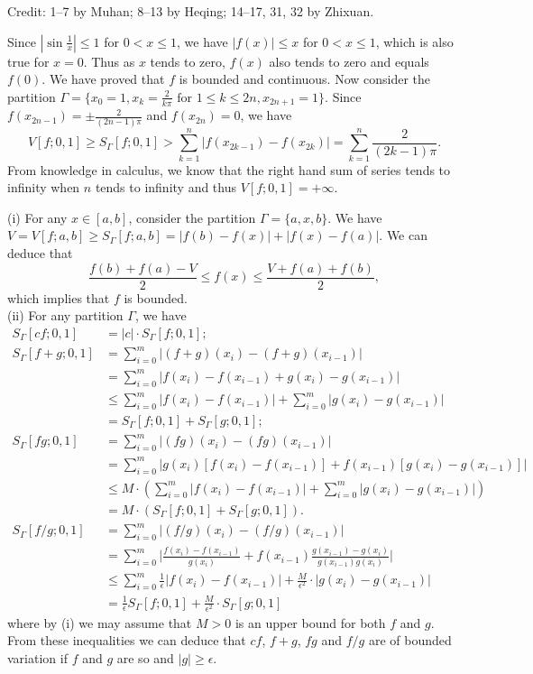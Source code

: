 
Credit: 1--7 by Muhan; 8--13 by Heqing; 14--17, 31, 32 by Zhixuan.

\begin{exercise}{2.1}
  Since $|\sin{\frac{1}{x}}|\leq1$ for $0<x\leq 1$,
  we have $|f(x)|\leq x$ for $0<x\leq 1$,
  which is also true for $x=0$.
  Thus as $x$ tends to zero,
  $f(x)$ also tends to zero and equals $f(0)$.
  We have proved that $f$ is bounded and continuous.
  Now consider the partition
  $\Gamma=\{x_0=1,x_k=\frac{2}{k\pi}\text{ for }1\leq k\leq 2n, x_{2n+1}=1\}$.
  Since $f(x_{2n-1})=\pm\frac{2}{(2n-1)\pi}$ and $f(x_{2n})=0$,
  we have
  \[
    V[f;0,1]\geq S_{\Gamma}[f;0,1]>\sum_{k=1}^{n}|f(x_{2k-1})-f(x_{2k})|=\sum_{k=1}^{n}\frac{2}{(2k-1)\pi}.
  \]
  From knowledge in calculus,
  we know that the right hand sum of series tends to infinity
  when $n$ tends to infinity and thus $V[f;0,1]=+\infty$.
\end{exercise}

\begin{exercise}{2.2}
(i) For any $x\in [a,b]$, consider the partition $\Gamma=\{a,x,b\}$.
We have $V=V[f;a,b]\geq S_{\Gamma}[f;a,b]=|f(b)-f(x)|+|f(x)-f(a)|$.
We can deduce that
\[
  \frac{f(b)+f(a)-V}{2}\leq f(x)\leq \frac{V+f(a)+f(b)}{2},
\]
which implies that $f$ is bounded.\\
(ii) For any partition $\Gamma$, we have
\allowdisplaybreaks
\begin{align*}
  S_{\Gamma}[cf;0,1]&=|c|\cdot S_{\Gamma}[f;0,1];\\
  S_{\Gamma}[f+g;0,1]&=\sum_{i=0}^m|(f+g)(x_i)-(f+g)(x_{i-1})|\\
  &=\sum_{i=0}^m|f(x_i)-f(x_{i-1})+g(x_i)-g(x_{i-1})|\\
  &\leq\sum_{i=0}^m|f(x_i)-f(x_{i-1})|+\sum_{i=0}^m|g(x_i)-g(x_{i-1})|\\
  &=S_{\Gamma}[f;0,1]+S_{\Gamma}[g;0,1];\\
  S_{\Gamma}[fg;0,1]&=\sum_{i=0}^m|(fg)(x_i)-(fg)(x_{i-1})|\\
  &=\sum_{i=0}^m|g(x_i)[f(x_i)-f(x_{i-1})]+f(x_{i-1})[g(x_i)-g(x_{i-1})]|\\
  &\leq M\cdot(\sum_{i=0}^m|f(x_i)-f(x_{i-1})|+\sum_{i=0}^m|g(x_i)-g(x_{i-1})|)\\
  &=M\cdot (S_{\Gamma}[f;0,1]+S_{\Gamma}[g;0,1]).\\
  S_{\Gamma}[f/g;0,1]&=\sum_{i=0}^m|(f/g)(x_i)-(f/g)(x_{i-1})|\\
  &=\sum_{i=0}^m\bigg|\frac{f(x_i)-f(x_{i-1})}{g(x_i)}+f(x_{i-1})\frac{g(x_{i-1})-g(x_i)}{g(x_{i-1})g(x_i)}\bigg|\\
  &\leq \sum_{i=0}^m\frac{1}{\epsilon}|f(x_i)-f(x_{i-1})|+\frac{M}{\epsilon^2}\cdot|g(x_i)-g(x_{i-1})|\\
  &=\frac{1}{\epsilon}S_{\Gamma}[f;0,1]+\frac{M}{\epsilon^2}\cdot S_{\Gamma}[g;0,1]
\end{align*}
where by (i) we may assume that $M>0$ is an upper bound for both $f$ and $g$.
From these inequalities we can deduce that $cf$, $f+g$, $fg$ and $f/g$
are of bounded variation if $f$ and $g$ are so and $|g|\geq \epsilon$.
\end{exercise}

